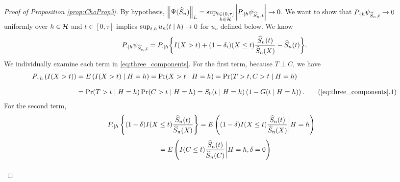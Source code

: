 \begin{proof}[Proof of Proposition \ref{prop:ChoProp3}] 

{%
\newcommand{\termone}{I(X>t)}
\newcommand{\termtwo}{\omdi(X\leq t) \frac{\Snhat\argt}{\Snhat\argX}}
\newcommand{\termthree} {\Snhat\argt}
\newcommand{\estfunclongtrue}{\termone + \termtwo - \termthree}
\newcommand{\bigE}{E_{\unnormdirac\estfunctruesurvlabel\mid\unnormdirac}}
\newcommand{\bigEone}{E_{\unnormdirac\estfunctruesurvlabel\mid\unnormdirac = 1}}
\newcommand{\smallE}{E_{\unnormdirac}}
By hypothesis, $\left\lVert\Psi(\widehat{S}_n)\right\rVert_L = \operatorname*{\sup_{\substack{t\in(0,\tau] \\ h \in \mathcal{H}}}} \bigg| P_{\cdot\mid h}\psi_{\widehat{S}_n,t} \bigg| \to 0$. We want to show that $P_{\cdot\mid h}\psi_{\widehat{S}_n,t} \to 0$ uniformly over $h \in \mathcal{H}$ and $t \in [0, \tau]$ implies $
\sup_{t,h} u_n(t \mid h) \to 0$ for $u_n$ defined below. We know 
\begin{align}
\label{eq:three_components}
\PdotSnhat = \PopP_{\cdot\mid \histlower} \bigg\{ 
\termone
+\termtwo
-\termthree
\bigg\}.
\end{align}
We individually examine each term in \cref{eq:three_components}.
For the first term, because $T\perp C$, we have 
\begin{align}
\label{eq:component1}
\Pd \left( \termone \right) &= E\left( \termone \mid \heh \right) = \Pr(X>t\mid \heh ) = \Pr(T>t, C>t\mid \heh ) \notag \eqnspace
&= \Pr(T>t\mid \heh )\Pr(C>t\mid \heh ) = \truesurv(t\mid \heh)\left( 1 - G(t\mid \heh) \right). \tag{\ref{eq:three_components}.1}
\end{align}
} %
{ %
\newcommand{\indx}{I(X\leq t)}
\newcommand{\fracX}{\frac{\Snhat\argt}{\Snhat\argX}}
\newcommand{\fracC}{\frac{\Snhat\argt}{\Snhat\argC}}
\newcommand{\fracCheh}{\frac{\Snhat(t\mid \heh)}{\Snhat(C\mid\heh)}}
\newcommand{\argcheh}{(c\mid\heh)}
\newcommand{\argtheh}{(t\mid\heh)}
\newcommand{\arguheh}{(u\mid\heh)}
\newcommand{\intc}{\int_c^\infty}
For the second term,
\begin{align*}
\label{eq:component2}
\Pd \left\{ \omd \indx \fracX \right\} &= E\left( \omd \indx \fracX \bigg| \heh \right) %
\end{align*}
\begin{align}
&= E\left( I(C\leq t) \fracC \bigg| \heh, \delta = 0 \right) \notag \eqnspace

\end{align}}
\end{proof}
